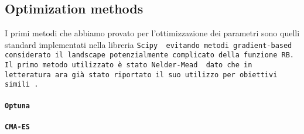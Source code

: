 \begin{comment}
        SINGLE QUBIT RANDOMIZED BENCHMARKING (for gates >= 40ns)
The program consists in playing random sequences of Clifford gates and measuring the state of the resonator afterwards.
Each random sequence is derived on the FPGA for the maximum depth (specified as an input) and played for each depth
asked by the user (the sequence is truncated to the desired depth). Each truncated sequence ends with the recovery gate,
found at each step thanks to a preloaded lookup table (Cayley table), that will bring the qubit back to its ground state.

If the readout has been calibrated and is good enough, then state discrimination can be applied to only return the state
of the qubit. Otherwise, the 'I' and 'Q' quadratures are returned.
Each sequence is played n_avg times for averaging. A second averaging is performed by playing different random sequences.

The data is then post-processed to extract the single-qubit gate fidelity and error per gate
.
Prerequisites:
    - Having found the resonance frequency of the resonator coupled to the qubit under study (resonator_spectroscopy).
    - Having calibrated qubit pi pulse (x180) by running qubit, spectroscopy, rabi_chevron, power_rabi and updated the config.
    - Having the qubit frequency perfectly calibrated (ramsey).
    - (optional) Having calibrated the readout (readout_frequency, amplitude, duration_optimization IQ_blobs) for better SNR.

\end{comment}
\subsection{Optimization methods}\label{Sec:OptimizationMethods}
I primi metodi che abbiamo provato per l'ottimizzazione dei parametri sono quelli standard implementati nella libreria \tt{Scipy} \cite{SciPy-NMeth} evitando metodi gradient-based considerato il landscape potenzialmente complicato della funzione RB.
Il primo metodo utilizzato è stato Nelder-Mead \cite{NelderMead} dato che in letteratura ara già stato riportato il suo utilizzo per obiettivi simili \cite{kelly_optimal_2014}.

\paragraph{\tt{Optuna}}
\cite{optuna_2019}

\paragraph{\tt{CMA-ES}}
\cite{cmaessimplepractical}

